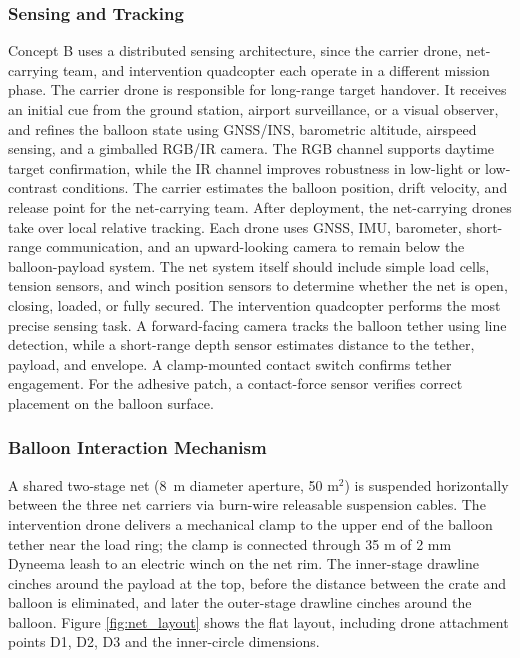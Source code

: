 \subsubsection{Sensing and Tracking}
\label{subsubsec:conceptB_sensing_tracking}

Concept B uses a distributed sensing architecture, since the carrier drone, net-carrying team, and intervention quadcopter each operate in a different mission phase. The carrier drone is responsible for long-range target handover. It receives an initial cue from the ground station, airport surveillance, or a visual observer, and refines the balloon state using GNSS/INS, barometric altitude, airspeed sensing, and a gimballed RGB/IR camera. The RGB channel supports daytime target confirmation, while the IR channel improves robustness in low-light or low-contrast conditions. The carrier estimates the balloon position, drift velocity, and release point for the net-carrying team. After deployment, the net-carrying drones take over local relative tracking. Each drone uses GNSS, IMU, barometer, short-range communication, and an upward-looking camera to remain below the balloon-payload system.  The net system itself should include simple load cells, tension sensors, and winch position sensors to determine whether the net is open, closing, loaded, or fully secured. The intervention quadcopter performs the most precise sensing task. A forward-facing camera tracks the balloon tether using line detection, while a short-range depth sensor estimates distance to the tether, payload, and envelope. A clamp-mounted  contact switch confirms tether engagement. For the adhesive patch, a contact-force sensor verifies correct placement on the balloon surface.


\subsubsection{Balloon Interaction Mechanism}
A shared two-stage net (8~m diameter aperture, 50 m$^2$) is suspended horizontally between the three net carriers via burn-wire releasable suspension cables. The intervention drone delivers a mechanical clamp to the upper end of the balloon tether near the load ring; the clamp is connected through 35 m of 2 mm Dyneema leash to an electric winch on the net rim. The inner-stage drawline cinches around the payload at the top, before the distance between the crate and balloon is eliminated, and later the outer-stage drawline cinches around the balloon. Figure  \ref{fig:net_layout} shows the flat layout, including drone attachment points D1, D2, D3 and the inner-circle dimensions.


